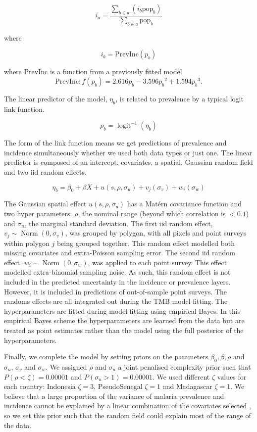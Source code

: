 \documentclass[10pt,letterpaper]{article}
\begin{document}
$$i_a = \frac{ \sum_{b \in a}(i_b \mathrm{pop}_b)}{\sum_{b \in a}\mathrm{pop}_b} $$

where

$$i_b = \mathrm{PrevInc}(p_b)$$

where $\mathrm{PrevInc}$ is a function from a previously fitted model \cite{cameron2015defining} 
$$\mathrm{PrevInc}: f\left(p_b\right) = 2.616p_b - 3.596{p_b}^2 + 1.594{p_b}^3.$$

The linear predictor of the model, $\eta_b$, is related to prevalence by a typical logit link function.

$$p_b = \operatorname{logit}^{-1}(\eta_b)$$


The form of the link function means we get predictions of prevalence and incidence simultaneously whether we used both data types or just one.
The linear predictor is composed of an intercept, covariates, a spatial, Gaussian random field and two iid random effects.

$$\eta_b = \beta_0 + \beta X  + u(s, \rho, \sigma_u) + v_j(\sigma_v) + w_i(\sigma_w)$$

The Gaussian spatial effect $u(s, \rho, \sigma_u)$ has a Mat\'ern covariance function and two hyper parameters: $\rho$, the nominal range (beyond which correlation is $< 0.1$) and $\sigma_u$, the marginal standard deviation.
The first iid random effect, $v_j \sim \operatorname{Norm}(0, \sigma_v)$,  was grouped by polygon, with all pixels and point surveys within polygon $j$ being grouped together.
This random effect modelled both missing covariates and extra-Poisson sampling error. 
The second iid random effect, $w_i \sim \operatorname{Norm}(0, \sigma_w)$, was applied to each point survey.
This effect modelled extra-binomial sampling noise.
As such, this random effect is not included in the predicted uncertainty in the incidence or prevalence layers.
However, it is included in predictions of out-of-sample point surveys.
The randoms effects are all integrated out during the TMB model fitting.
The hyperparameters are fitted during model fitting using empirical Bayes.
In this empirical Bayes scheme the hyperparameters are learned from the data but are treated as point estimates rather than the model using the full posterior of the hyperparameters.



Finally, we complete the model by setting priors on the parameters $\beta_0, \beta, \rho$ and $\sigma_u$, $\sigma_v$ and $\sigma_w$.
We assigned $\rho$ and $\sigma_u$ a joint penalised complexity prior \cite{fuglstad2018constructing} such that $P(\rho < \zeta) = 0.00001$ and $P(\sigma_u > 1) = 0.00001$.
We used different $\zeta$ values for each country: Indonesia $\zeta = 3$, PseudoSenegal $\zeta = 1$ and Madagascar $\zeta = 1$.
We believe that a large proportion of the variance of malaria prevalence and incidence cannot be explained by a linear combination of the covariates selected \cite{bhatt2017improved}, so we set this prior such that the random field could explain most of the range of the data.
\end{document}

